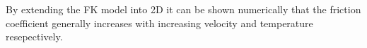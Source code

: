 By extending the FK model into 2D \cite{FK2D} it can be shown numerically that the friction coefficient generally increases with increasing velocity and temperature resepectively. 






















